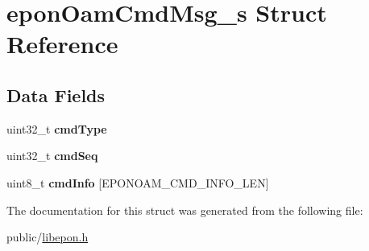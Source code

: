 \hypertarget{structeponOamCmdMsg__s}{}\section{epon\+Oam\+Cmd\+Msg\+\_\+s Struct Reference}
\label{structeponOamCmdMsg__s}
\subsection*{Data Fields}
\begin{DoxyCompactItemize}
\item 
\mbox{\label{structeponOamCmdMsg__s_a4e999e479311e8e8f14bd60eef7b6bc5}} 
uint32\+\_\+t {\bfseries cmd\+Type}
\item 
\mbox{\label{structeponOamCmdMsg__s_a8c1e6464f6e0c40d7a1fdb11301bd5b2}} 
uint32\+\_\+t {\bfseries cmd\+Seq}
\item 
\mbox{\label{structeponOamCmdMsg__s_a217fa925416ffb70cb0bbb0f3a4349d5}} 
uint8\+\_\+t {\bfseries cmd\+Info} \mbox{[}E\+P\+O\+N\+O\+A\+M\+\_\+\+C\+M\+D\+\_\+\+I\+N\+F\+O\+\_\+\+L\+EN\mbox{]}
\end{DoxyCompactItemize}


The documentation for this struct was generated from the following file\+:\begin{DoxyCompactItemize}
\item 
public/\hyperlink{libepon_8h}{libepon.\+h}\end{DoxyCompactItemize}
